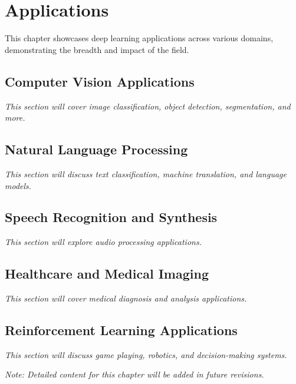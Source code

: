 
\chapter{Applications}
\label{chap:applications}

This chapter showcases deep learning applications across various domains, demonstrating the breadth and impact of the field.

\section{Computer Vision Applications}

\textit{This section will cover image classification, object detection, segmentation, and more.}

\section{Natural Language Processing}

\textit{This section will discuss text classification, machine translation, and language models.}

\section{Speech Recognition and Synthesis}

\textit{This section will explore audio processing applications.}

\section{Healthcare and Medical Imaging}

\textit{This section will cover medical diagnosis and analysis applications.}

\section{Reinforcement Learning Applications}

\textit{This section will discuss game playing, robotics, and decision-making systems.}

\vspace{1em}
\noindent\textit{Note: Detailed content for this chapter will be added in future revisions.}
